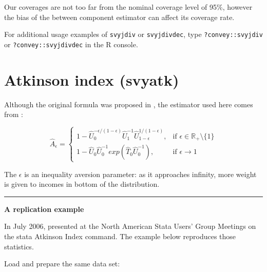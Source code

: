 \documentclass[
]{book}
\begin{document}
Our coverages are not too far from the nominal coverage level of 95\%, however the bias of the between component estimator can affect its coverage rate.

For additional usage examples of \texttt{svyjdiv} or \texttt{svyjdivdec}, type \texttt{?convey::svyjdiv} or \texttt{?convey::svyjdivdec} in the R console.

\hypertarget{atkinson-index-svyatk}{%
\section{Atkinson index (svyatk)}\label{atkinson-index-svyatk}}

Although the original formula was proposed in \textcite{atkinson1970}, the estimator used here comes from \textcite{biewen2003}:

\[
\widehat{A}_\epsilon =
\begin{cases}
 1 - \widehat{U}_0^{ - \epsilon/(1 - \epsilon) } \widehat{U}_1^{ -1 } \widehat{U}_{1 - \epsilon}^{ 1/(1 - \epsilon) } , &\text{if } \epsilon \in \mathbb{R}_+ \setminus\{ 1 \} \\
1 - \widehat{U}_0 \widehat{U}_0^{-1} exp( \widehat{T}_0 \widehat{U}_0^{-1} ), &\text{if } \epsilon \rightarrow1
\end{cases}
\]

The \(\epsilon\) is an inequality aversion parameter: as it approaches infinity, more weight is given to incomes in bottom of the distribution.

\begin{center}\rule{0.5\linewidth}{0.5pt}\end{center}

\textbf{A replication example}

In July 2006, \textcite{jenkins2006} presented at the North American Stata Users' Group Meetings on the stata Atkinson Index command. The example below reproduces those statistics.

Load and prepare the same data set:
\end{document}
